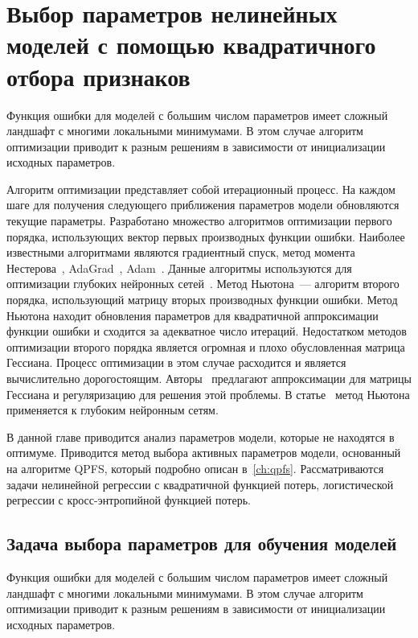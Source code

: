 \chapter{Выбор параметров нелинейных моделей с помощью квадратичного отбора признаков}
\label{ch:newton_qpfs}

Функция ошибки для моделей с большим числом параметров имеет сложный ландшафт с многими локальными минимумами.
В этом случае алгоритм оптимизации приводит к разным решениям в зависимости от инициализации исходных параметров.

Алгоритм оптимизации представляет собой итерационный процесс.
На каждом шаге для получения следующего приближения параметров модели обновляются текущие параметры.
Разработано множество алгоритмов оптимизации первого порядка, использующих вектор первых производных функции ошибки.
Наиболее известными алгоритмами являются градиентный спуск, 
метод момента Нестерова~\cite{nesterov1983momentum}, AdaGrad~\cite{duchi2011adagrad}, Adam~\cite{kingma2014adam}.
Данные алгоритмы используются для оптимизации глубоких нейронных сетей~\cite{goodfellow2016deeplearningbook}.
Метод Ньютона~--- алгоритм второго порядка, использующий матрицу вторых производных функции ошибки.
Метод Ньютона находит обновления параметров для квадратичной аппроксимации функции ошибки и сходится за адекватное число итераций.
Недостатком методов оптимизации второго порядка является огромная и плохо обусловленная матрица Гессиана.
Процесс оптимизации в этом случае расходится и является вычислительно дорогостоящим.
Авторы~\cite{avriel2003nonlinear,blaschke1997convergence} предлагают аппроксимации для матрицы Гессиана и регуляризацию для решения этой проблемы.
В статье~\cite{botev2017newtondeeplearning} метод Ньютона применяется к глубоким нейронным сетям.

В данной главе приводится анализ параметров модели, которые не находятся в оптимуме.
Приводится метод выбора активных параметров модели, основанный на алгоритме QPFS, который подробно описан в~\autoref{ch:qpfs}.
Рассматриваются задачи нелинейной регрессии с квадратичной функцией потерь, логистической регрессии с кросс-энтропийной функцией потерь.  

\section{Задача выбора параметров для обучения моделей}

Функция ошибки для моделей с большим числом параметров имеет сложный ландшафт с многими локальными минимумами.
В этом случае алгоритм оптимизации приводит к разным решениям в зависимости от инициализации исходных параметров.

